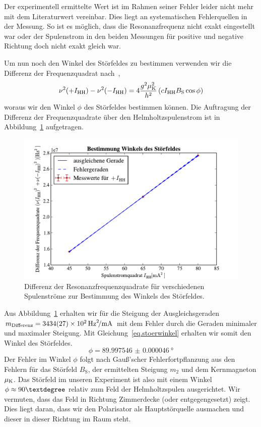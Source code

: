 \documentclass[paper=a4,
	fontsize=10pt,
	DIV=18,
	twocolumn,
	parskip=half
	]{scrartcl}
\numberwithin{equation}{section}    %
\begin{document}
Der experimentell ermittelte Wert ist im Rahmen seiner Fehler leider nicht mehr mit dem Literaturwert vereinbar. Dies liegt an systematischen Fehlerquellen in der Messung. So ist es möglich, dass die Resonanzfrequenz nicht exakt eingestellt war oder der Spulenstrom in den beiden Messungen für positive und negative Richtung doch nicht exakt gleich war.

Um nun noch den Winkel  des Störfeldes zu bestimmen verwenden wir die Differenz der Frequenzquadrat nach~\citet{anleitung},
\begin{equation}
	\nu^2(+I_{\rm HH}) - \nu^2(-I_{\rm HH}) = 4\frac{g^2\mu_{\rm K}^2}{h^2} \left( c I_{\rm HH} B_{\rm S} \cos\phi \right)
	\label{eq.stoerwinkel}
\end{equation}
woraus wir den Winkel $\phi$ des Störfeldes bestimmen können.
Die Auftragung der Differenz der Frequenzquadrate über den Helmholtzspulenstrom ist in Abbildung~\ref{fig.stoerwinkel} aufgetragen.

\begin{figure}[htp]
	\begin{center}
		\includegraphics[width=\columnwidth]{Data-Plots/10-helmholtz-diff.pdf}
	\caption{Differenz der Resonanzfrequenzquadrate für verschiedenen Spulenströme zur Bestimmung des Winkels des Störfeldes.}
	\label{fig.stoerwinkel}
	\end{center}
\end{figure}

Aus Abbildung~\ref{fig.stoerwinkel} erhalten wir für die Steigung der Ausgleichsgeraden $m_{\rm Differenz} = \SI[per-mode=symbol]{3434(27)e2}{\hertz\squared\per\milli\ampere}$ mit dem Fehler durch die Geraden minimaler und maximaler Steigung.
Mit Gleichung~\eqref{eq.stoerwinkel} erhalten wir somit den Winkel des Störfeldes.
\begin{equation}
	\phi = \SI{89.997546(46)}{\degree}
\end{equation}
Der Fehler im Winkel $\phi$ folgt nach Gauß'scher Fehlerfortpflanzung aus den Fehlern für das Störfeld $B_\mathrm{S}$, der ermittelten Steigung $m_2$ und dem Kernmagneton $\mu_{\rm K}$. Das Störfeld im unseren Experiment ist also mit einem Winkel $\phi \approx 90\textdegree$ relativ zum Feld der Helmholtzspulen ausgerichtet. Wir vermuten, dass das Feld in Richtung Zimmerdecke (oder entgegengesetzt) zeigt. Dies liegt daran, dass wir den Polarisator als Hauptstörquelle ausmachen und dieser in dieser Richtung im Raum steht.
\end{document}
